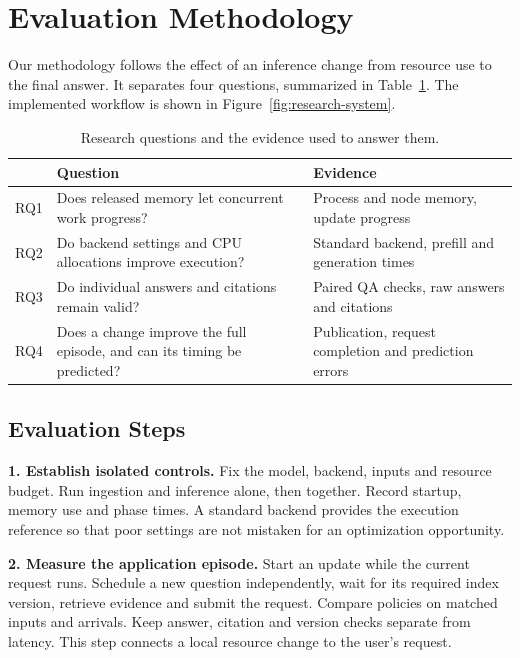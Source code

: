 \section{Evaluation Methodology}
\label{sec:problem}
Our methodology follows the effect of an inference change from resource use
to the final answer. It separates four questions, summarized in
Table~\ref{tab:research-questions}. The implemented workflow is shown in
Figure~\ref{fig:research-system}.

\begin{table}[!htb]
\caption{Research questions and the evidence used to answer them.}
\label{tab:research-questions}
\centering
\begin{tabular}{@{}p{.7cm}p{3.6cm}p{2.7cm}@{}}
\toprule
 & Question & Evidence\\
\midrule
RQ1 & Does released memory let concurrent work progress? & Process and node memory, update progress\\[3pt]
RQ2 & Do backend settings and CPU allocations improve execution? & Standard backend, prefill and generation times\\[3pt]
RQ3 & Do individual answers and citations remain valid? & Paired QA checks, raw answers and citations\\[3pt]
RQ4 & Does a change improve the full episode, and can its timing be predicted? & Publication, request completion and prediction errors\\
\bottomrule
\end{tabular}
\end{table}



\subsection{Evaluation Steps}
\textbf{1. Establish isolated controls.} Fix the model, backend, inputs and
resource budget. Run ingestion and inference alone, then together. Record
startup, memory use and phase times. A standard backend provides the execution
reference so that poor settings are not mistaken for an optimization opportunity.

\textbf{2. Measure the application episode.} Start an update while the current
request runs. Schedule a new question independently, wait for its required index
version, retrieve evidence and submit the request. Compare policies on matched
inputs and arrivals. Keep answer, citation and version checks separate from
latency. This step connects a local resource change to the user's request.

